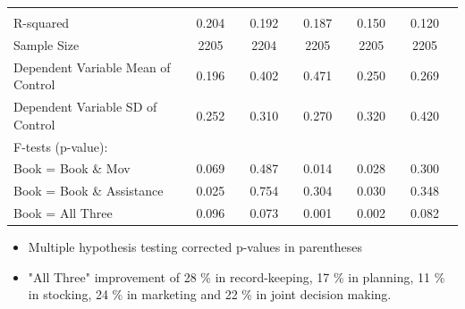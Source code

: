 \documentclass[10pt]{beamer}
\begin{document}
\begin{frame}
{{\begin{table}[t]
\begin{tabular}{l*{10}{c}}
\hline         							
\\
R-squared									&               0.204   	 &&          0.192   	&&           0.187   	&&           0.150	 &&           0.120             \\
Sample Size 								&               2205   	  &&          2204   	   &&         2205   	 &&           2205   	    &&        2205      \\
Dependent Variable Mean of Control 		&                  0.196  	  &&         0.402   	 &&          0.471    &&	           0.250    	 &&          0.269          \\
Dependent Variable SD of Control 			&              0.252    	 &&          0.310   	  &&         0.270      	  &&         0.320    && 	           0.420        	\\
F-tests (p-value):							&			&&			&&			&&			\\
\hspace{5mm}Book = Book \& Mov				        &               0.069   	   &&           0.487   	  &&          0.014     	  &&          0.028    	 &&          0.300           \\
\hspace{5mm}Book = Book \& Assistance				        &               0.025  	  &&          0.754     	 &&           0.304   	 &&          0.030    	  &&          0.348                 \\
\hspace{5mm}Book = All Three				        &                  0.096    	  &&         0.073    	    &&      0.001   	  &&         0.002    &&	         0.082        \\
\hline
	\end{tabular}
\end{table}}}
\begin{itemize}
\item Multiple hypothesis testing corrected p-values in parentheses
\item "All Three" improvement of 28 \% in record-keeping, 17 \% in planning, 11 \% in stocking, 24 \% in marketing and 22 \% in joint decision making.
\end{itemize}
\end{frame}
\end{document}
